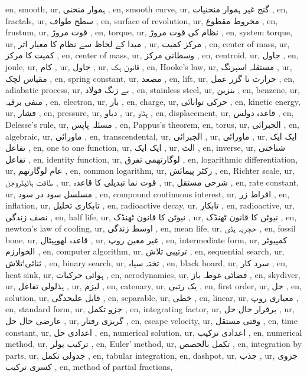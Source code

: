 en, smooth,
ur, ہموار منحنی ,
en, smooth curve,
ur, گنج غیر ہموار منحنیات ,
en, fractals,
ur, سطح طواف ,
en, surface of revolution,
ur, مخروط مقطوع ,
en, frustum,
ur, قوت مروڑ ,
en, torque,
ur, نظام کی قوت مروڑ ,
en, system torque,
ur, مبدا کے لحاظ سے نظام کا معیار اثر ,
ur, مرکز کمیت ,
en, center of mass,
ur, کمیت کا مرکز ,
en, center of mass,
ur, وسطانی مرکز ,
en, centroid,
ur, جاول ,
en, joule,
ur, کام ,
ur, جاول ,
ur, قانون ہک ,
en, Hooke's law,
ur, مستقلہ اسپرنگ ,
ur, مقیاس لچک ,
en, spring constant,
ur, مصعد ,
en, lift,
ur, حرارت نا گزر عمل ,
en, adiabatic process,
ur, بے زنگ فولاد ,
en, stainless steel,
ur, بنزین ,
en, benzene,
ur, منفی برقیہ ,
en, electron,
ur, بار ,
en, charge,
ur, حرکی توانائی ,
en, kinetic energy,
ur, فشار ,
en, pressure,
ur, دباو ,
ur, ہٹاو ,
en, displacement,
ur, قاعدہ دولس ,
en, Delesse's rule,
ur, مسئلہ پاپس ,
en, Pappus's theorem,
en, torus,
ur, الجبرائی ,
en, algebraic,
ur, ماورائی ,
en, transcendental,
ur, الجبرائی ,
ur, ماورائی ,
ur, ایک ایک تفاعل ,
en, one to one function,
ur, ایک ایک ,
ur, الٹ ,
en, inverse,
ur, شناختی تفاعل ,
en, identity function,
ur, لوگارتھمی تفرق ,
en, logarithmic differentiation,
ur, عام لوگارتھم ,
en, common logarithm,
ur, رکٹر پیمائش ,
en, Richter scale,
ur, طاقت ہائیڈروجن ,
ur, قوت نما تبدیلی کا قاعدہ ,
ur, شرحی مستقل ,
en, rate constant,
ur, مسلسل سود در سود ,
en, compound continuous interest,
ur, افراط زر ,
en, inflation,
ur, تابکاری تحلیل ,
en, radioactive decay,
ur, تابکار ,
en, radioactive,
ur, نصف زندگی ,
en, half life,
ur, نیوٹن کا قانون ٹھنڈک ,
ur, نیوٹن کا قانون ٹھنڈک ,
en, newton's law of cooling,
ur, اوسط زندگی ,
en, mean life,
ur, حجریہ ہڈی ,
en, fossil bone,
ur, قاعدہ لھوپیٹال ,
ur, غیر معین روپ ,
en, intermediate form,
ur, کمپیوٹر الخوارزم ,
en, computer algorithm,
ur, ترتیبی تلاش ,
en, sequential search,
ur, ثنائی!تلاش ,
en, binary search,
ur, تختہ سیاہ ,
en, black board,
ur, سرد کار ,
en, heat sink,
ur, ہوائی حرکیات ,
en, aerodynamics,
ur, فضائی غوطہ باز ,
en, skydiver,
ur, ہذلولی تفاعل ,
ur, لیزم ,
en, catenary,
ur, یک رتبی ,
en, first order,
ur, حل ,
en, solution,
ur, قابل علیحدگی ,
en, separable,
ur, خطی ,
en, linear,
ur, معیاری روپ ,
en, standard form,
ur, جزو تکمل ,
en, integrating factor,
ur, برقرار حال حل ,
ur, عارضی حال حل ,
ur, گریزی رفتار ,
en, escape velocity,
ur, وقتی مستقل ,
en, time constant,
ur, اعدادی حل ,
en, numerical solution,
ur, اعدادی ترکیب ,
en, numerical method,
ur, ترکیب یولر ,
en, Euler' method,
ur, تکمل بالحصص ,
en, integration by parts,
ur, جدولی تکمل ,
en, tabular integration,
en, dashpot,
ur, جذب ,
ur, جزوی کسری ترکیب ,
en, method of partial fractions,

